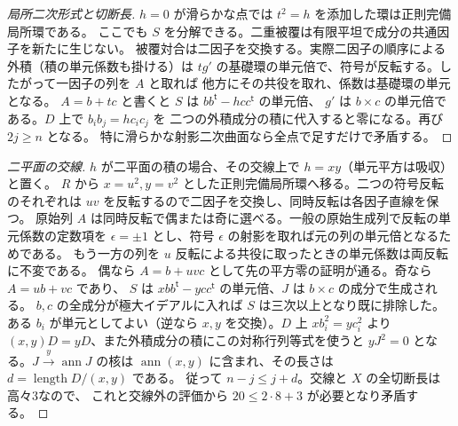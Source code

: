 \begin{proof}[局所二次形式と切断長]
$h=0$ が滑らかな点では $t^2=h$ を添加した環は正則完備局所環である。
ここでも $S$ を分解できる。二重被覆は有限平坦で成分の共通因子を新たに生じない。
被覆対合は二因子を交換する。実際二因子の順序による外積（積の単元係数も掛ける）は
$t g'$ の基礎環の単元倍で、符号が反転する。したがって一因子の列を $A$ と取れば
他方にその共役を取れ、係数は基礎環の単元となる。
$A=b+t c$ と書くと $S$ は $bb^{\mathsf t}-hcc^{\mathsf t}$ の単元倍、
$g'$ は $b\times c$ の単元倍である。$D$ 上で $b_i b_j=h c_i c_j$ を
二つの外積成分の積に代入すると零になる。再び $2j\ge n$ となる。
特に滑らかな射影二次曲面なら全点で足すだけで矛盾する。
\end{proof}

\begin{proof}[二平面の交線]
$h$ が二平面の積の場合、その交線上で $h=xy$（単元平方は吸収）と置く。
$R$ から $x=u^2,y=v^2$ とした正則完備局所環へ移る。二つの符号反転のそれぞれは
$uv$ を反転するので二因子を交換し、同時反転は各因子直線を保つ。
原始列 $A$ は同時反転で偶または奇に選べる。一般の原始生成列で反転の単元係数の定数項を
$\epsilon=\pm1$ とし、符号 $\epsilon$ の射影を取れば元の列の単元倍となるためである。
もう一方の列を $u$ 反転による共役に取ったときの単元係数は両反転に不変である。
偶なら $A=b+uv c$ として先の平方零の証明が通る。奇なら $A=u b+v c$ であり、
$S$ は $x b b^{\mathsf t}-y c c^{\mathsf t}$ の単元倍、$J$ は $b\times c$ の成分で生成される。
$b,c$ の全成分が極大イデアルに入れば $S$ は三次以上となり既に排除した。
ある $b_i$ が単元としてよい（逆なら $x,y$ を交換）。$D$ 上
$x b_i^2=y c_i^2$ より $(x,y)D=yD$、また外積成分の積にこの対称行列等式を使うと
$y J^2=0$ となる。$J\xrightarrow{y}\operatorname{ann}J$ の核は
$\operatorname{ann}(x,y)$ に含まれ、その長さは $d=\operatorname{length}D/(x,y)$ である。
従って $n-j\le j+d$。交線と $X$ の全切断長は高々3なので、
これと交線外の評価から $20\le2\cdot8+3$ が必要となり矛盾する。
\end{proof}

